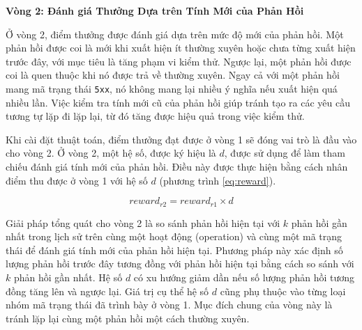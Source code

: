   \noindent\textbf{Vòng 2: Đánh giá Thưởng Dựa trên Tính Mới của Phản Hồi }


Ở vòng 2, điểm thưởng được đánh giá dựa trên mức độ mới của phản hồi. Một phản hồi được coi là mới khi  xuất hiện ít thường xuyên hoặc chưa từng xuất hiện trước đây, với mục tiêu là tăng phạm vi kiểm thử.
Ngược lại, một phản hồi được coi là quen thuộc khi nó được trả về thường xuyên. Ngay cả với một phản hồi mang mã trạng thái \texttt{5xx}, nó không mang lại nhiều ý nghĩa nếu xuất hiện quá nhiều lần. Việc kiểm tra tính mới cũ của phản hồi giúp tránh tạo ra các yêu cầu tương tự lặp đi lặp lại, từ đó tăng được hiệu quả trong việc kiểm thử.

Khi cài đặt thuật toán, điểm thưởng đạt được ở vòng 1 sẽ đóng vai trò là đầu vào cho vòng 2. Ở vòng 2, một hệ số, được ký hiệu là $d$, được sử dụng để làm tham chiếu đánh giá tính mới của phản hồi. Điều này được thực hiện bằng cách nhân điểm thu được ở vòng 1 với hệ số $d$  (phương trình \ref{eq:reward}).


\begin{equation}
\label{eq:reward}
    reward_{r2} = reward_{r1} \times d
\end{equation}

Giải pháp tổng quát cho vòng 2 là so sánh phản hồi hiện tại với $k$ phản hồi gần nhất trong lịch sử trên cùng một hoạt động (operation) và cùng một mã trạng thái để đánh giá tính mới của phản hồi hiện tại. Phương pháp này xác định số lượng phản hồi trước đây tương đồng với phản hồi hiện tại bằng cách so sánh với $k$ phản hồi gần nhất. Hệ số $d$ có xu hướng giảm dần nếu số lượng phản hồi tương đồng tăng lên và ngược lại.
Giá trị cụ thể hệ số $d$ cũng phụ thuộc vào từng loại nhóm mã trạng thái đã trình bày ở vòng 1. Mục đích chung của vòng này là  tránh lặp lại cùng một phản hồi một cách thường xuyên.



